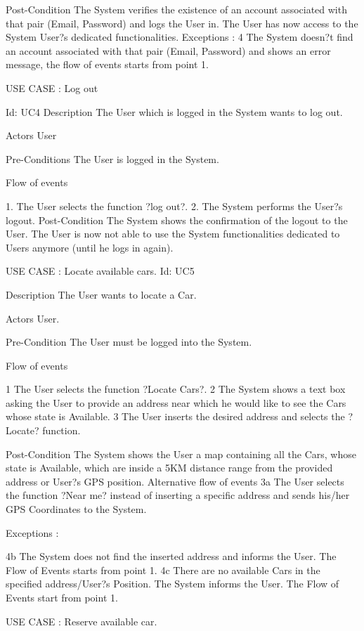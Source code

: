 \documentclass[12pt]{article}
\begin{document}
Post-Condition
The System verifies the existence of an account associated with that pair (Email, Password) and logs the User in.
 The User has now access to the System User?s dedicated functionalities.
Exceptions :
4 	The System doesn?t find an account associated with that pair (Email, Password) and   shows an error message, the flow of events starts from point 1.

USE CASE : Log out

Id:  UC4
Description
The User which is logged in the System wants to log out.

Actors
User

Pre-Conditions
The User is logged in the System.



Flow of events

1. The User selects the function ?log out?.
2. The System performs the User?s logout.
Post-Condition
The System shows the confirmation of the logout to the User.
The User is now not able to use the System functionalities dedicated to Users anymore (until he logs in again).

USE CASE : Locate available cars.
Id:  UC5

Description
The User wants to locate a Car.

Actors
User.

Pre-Condition
The User must be logged into the System.

Flow of events

1 The User selects the function ?Locate Cars?.
2 The System shows a text box asking the User to provide an address near which he would like to see the Cars whose state is Available.
3 The User inserts the desired address and selects the ?Locate? function.

Post-Condition
The System shows the User a map containing all the Cars, whose state is Available, which are inside a 5KM distance range from the provided address or User?s GPS position.
Alternative flow of events
3a 	The User selects the function ?Near me? instead of inserting a specific address and sends his/her GPS Coordinates to the System.

Exceptions :

4b	The System does not find the inserted address and informs the User. The Flow of Events starts from point 1.
4c	There are no available Cars in the specified address/User?s Position. The System informs the User. The Flow of Events start from point 1.

		
USE CASE : Reserve available car.
\end{document}
